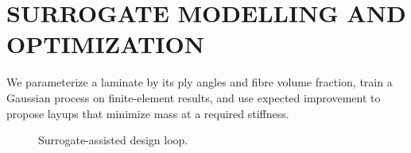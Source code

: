 \chapter{SURROGATE MODELLING AND OPTIMIZATION}
\label{ch:method}

We parameterize a laminate by its ply angles and fibre volume fraction, train a Gaussian process
on finite-element results, and use expected improvement to propose layups that minimize mass at a
required stiffness.

\begin{figure}[htbp]
  \centering
  \caption{Surrogate-assisted design loop.}
  \label{fig:loop}
\end{figure}
